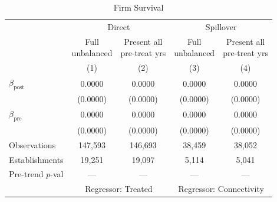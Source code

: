 \begin{table}[H]
\centering
\scriptsize
\caption{Firm Survival}
\begin{tabular}{lcccc}
\toprule
& \multicolumn{2}{c}{Direct} & \multicolumn{2}{c}{Spillover} \\
\cmidrule(lr){2-3} \cmidrule(lr){4-5}
& \shortstack{Full\\unbalanced} & \shortstack{Present all\\pre-treat yrs} & \shortstack{Full\\unbalanced} & \shortstack{Present all\\pre-treat yrs} \\
& (1) & (2) & (3) & (4) \\
\midrule
$\beta_{\text{post}}$ & 0.0000 & 0.0000 & 0.0000 & 0.0000 \\
& (0.0000) & (0.0000) & (0.0000) & (0.0000) \\[3pt]
$\beta_{\text{pre}}$ & 0.0000 & 0.0000 & 0.0000 & 0.0000 \\
& (0.0000) & (0.0000) & (0.0000) & (0.0000) \\[3pt]
\midrule
Observations & 147,593 & 146,693 & 38,459 & 38,052 \\
Establishments & 19,251 & 19,097 & 5,114 & 5,041 \\
Pre-trend $p$-val & --- & --- & --- & --- \\
\midrule
& \multicolumn{2}{c}{Regressor: Treated} & \multicolumn{2}{c}{Regressor: Connectivity} \\
\bottomrule
\end{tabular}
\begin{minipage}{\textwidth}
\footnotesize
\medskip

\end{minipage}
\end{table}

